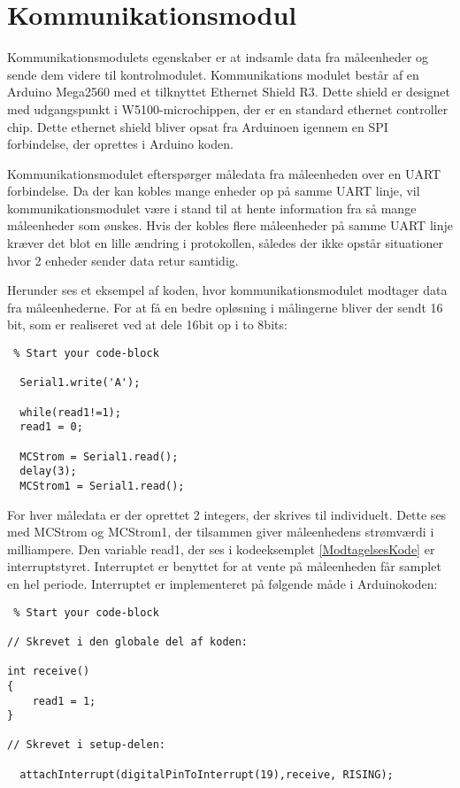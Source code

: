 
\section{Kommunikationsmodul}
\label{sec:Kommunikationsmodul}
Kommunikationsmodulets egenskaber er at indsamle data fra måleenheder og sende dem videre til kontrolmodulet. Kommunikations modulet består af en Arduino Mega2560 med et tilknyttet Ethernet Shield R3. Dette shield er designet med udgangspunkt i W5100-microchippen, der er en standard ethernet controller chip. Dette ethernet shield bliver opsat fra Arduinoen igennem en SPI forbindelse, der oprettes i Arduino koden. 

Kommunikationsmodulet efterspørger måledata fra måleenheden over en UART forbindelse. Da der kan kobles mange enheder op på samme UART linje, vil kommunikationsmodulet være i stand til at hente information fra så mange måleenheder som ønskes. Hvis der kobles flere måleenheder på samme UART linje kræver det blot en lille ændring i protokollen, således der ikke opstår situationer hvor 2 enheder sender data retur samtidig. 


Herunder ses et eksempel af koden, hvor kommunikationsmodulet modtager data fra måleenhederne. For at få en bedre opløsning i målingerne bliver der sendt 16 bit, som er realiseret ved at dele 16bit op i to 8bits: 

\begin{lstlisting} % Start your code-block
  
  Serial1.write('A');
  
  while(read1!=1);
  read1 = 0;
  
  MCStrom = Serial1.read();
  delay(3);
  MCStrom1 = Serial1.read();
\end{lstlisting}


For hver måledata er der oprettet 2 integers, der skrives til individuelt. Dette ses med MCStrom og MCStrom1, der tilsammen giver måleenhedens strømværdi i milliampere. 
Den variable read1, der ses i kodeeksemplet \ref{ModtagelsesKode} er interruptstyret. Interruptet er benyttet for at vente på måleenheden får samplet en hel periode. Interruptet er implementeret på følgende måde i Arduinokoden: 

\begin{lstlisting} % Start your code-block

// Skrevet i den globale del af koden:

int receive()
{
	read1 = 1;
}

// Skrevet i setup-delen:

  attachInterrupt(digitalPinToInterrupt(19),receive, RISING);

\end{lstlisting}



